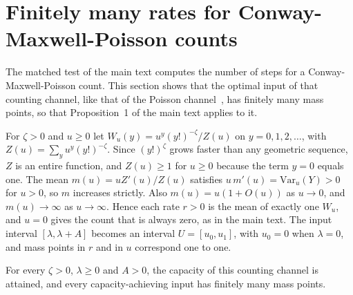 \section{Finitely many rates for Conway-Maxwell-Poisson counts}\label{sec:cmpfinite-s}
The matched test of the main text computes the number of steps for a Conway-Maxwell-Poisson count. This section shows that the
optimal input of that counting channel, like that of the Poisson channel~\cite{Shamai1990}, has finitely many mass points, so that
Proposition~1 of the main text applies to it.

For $\zeta>0$ and $u\ge0$ let $W_u(y)=u^y(y!)^{-\zeta}/Z(u)$ on $y=0,1,2,\dots$, with $Z(u)=\sum_y u^y(y!)^{-\zeta}$. Since
$(y!)^{\zeta}$ grows faster than any geometric sequence, $Z$ is an entire function, and $Z(u)\ge1$ for $u\ge0$ because the term
$y=0$ equals one. The mean $m(u)=uZ'(u)/Z(u)$ satisfies $u\,m'(u)=\mathrm{Var}_u(Y)>0$ for $u>0$, so $m$ increases strictly. Also
$m(u)=u(1+O(u))$ as $u\to0$, and $m(u)\to\infty$ as $u\to\infty$. Hence each rate $r>0$ is the mean of exactly one $W_u$, and
$u=0$ gives the count that is always zero, as in the main text. The input interval $[\lambda,\lambda+A]$ becomes an interval
$U=[u_0,u_1]$, with $u_0=0$ when $\lambda=0$, and mass points in $r$ and in $u$ correspond one to one.

\begin{proposition}\label{prop:cmpfinite}
For every $\zeta>0$, $\lambda\ge0$ and $A>0$, the capacity of this counting channel is attained, and every capacity-achieving input
has finitely many mass points.
\end{proposition}

